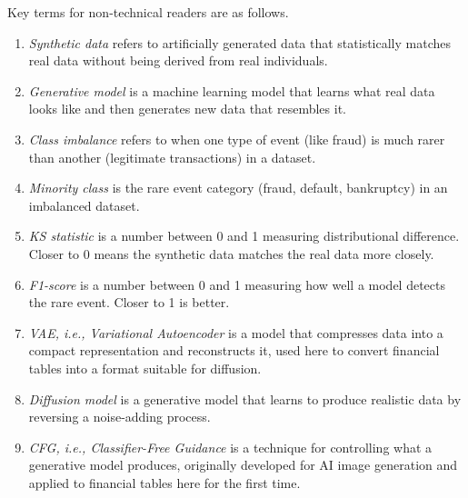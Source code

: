 Key terms for non-technical readers are as follows.

\begin{enumerate}
    \item \textit{Synthetic data} refers to artificially generated data that statistically matches real data without being derived from real individuals.
    \item \textit{Generative model} is a machine learning model that learns what real data looks like and then generates new data that resembles it.
    \item \textit{Class imbalance} refers to when one type of event (like fraud) is much rarer than another (legitimate transactions) in a dataset.
    \item \textit{Minority class} is the rare event category (fraud, default, bankruptcy) in an imbalanced dataset.
    \item \textit{KS statistic} is a number between 0 and 1 measuring distributional difference. Closer to 0 means the synthetic data matches the real data more closely.
    \item \textit{F1-score} is a number between 0 and 1 measuring how well a model detects the rare event. Closer to 1 is better.
    \item \textit{VAE, i.e., Variational Autoencoder} is a model that compresses data into a compact representation and reconstructs it, used here to convert financial tables into a format suitable for diffusion.
    \item \textit{Diffusion model} is a generative model that learns to produce realistic data by reversing a noise-adding process.
    \item \textit{CFG, i.e., Classifier-Free Guidance} is a technique for controlling what a generative model produces, originally developed for AI image generation and applied to financial tables here for the first time.
\end{enumerate}

